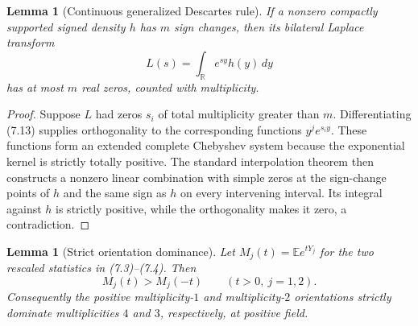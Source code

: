 \documentclass[11pt]{article}
\newtheorem{lemma}[theorem]{Lemma}
\newcommand{\E}{\mathbb E}
\newcommand{\R}{\mathbb R}
\begin{document}
\begin{lemma}[Continuous generalized Descartes rule]
\label{lem:descartes}
If a nonzero compactly supported signed density $h$ has $m$ sign changes,
then its bilateral Laplace transform
\begin{equation}
 L(s)=\int_{\R}e^{sy}h(y)\,dy                              \tag{7.13}
\end{equation}
has at most $m$ real zeros, counted with multiplicity.
\end{lemma}

\begin{proof}
Suppose $L$ had zeros $s_i$ of total multiplicity greater than $m$.
Differentiating (7.13) supplies orthogonality to the corresponding functions
$y^j e^{s_i y}$.  These functions form an extended complete Chebyshev system
because the exponential kernel is strictly totally positive.  The standard
interpolation theorem then constructs a nonzero linear combination with
simple zeros at the sign-change points of $h$ and the same sign as $h$ on
every intervening interval.  Its integral against $h$ is strictly positive,
while the orthogonality makes it zero, a contradiction.
\end{proof}

\begin{lemma}[Strict orientation dominance]\label{lem:orientation}
Let $M_j(t)=\E e^{tY_j}$ for the two rescaled statistics in (7.3)--(7.4).
Then
\begin{equation*}
 M_j(t)>M_j(-t)\qquad(t>0,\ j=1,2).
\end{equation*}
Consequently the positive multiplicity-$1$ and multiplicity-$2$
orientations strictly dominate multiplicities $4$ and $3$, respectively, at
positive field.
\end{lemma}
\end{document}
